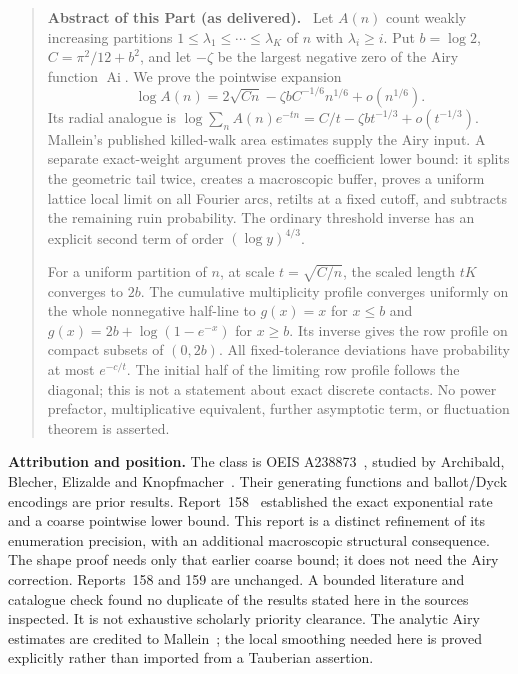 \documentclass[11pt,letterpaper]{article}
\numberwithin{equation}{section}
\theoremstyle{remark}\newtheorem{remark}[theorem]{Remark}
\newenvironment{partabstract}{\begin{quote}\small\noindent\textbf{Abstract of this Part (as delivered).}\ }{\end{quote}}
\begin{document}
\begin{partabstract}
Let $A(n)$ count weakly increasing partitions
$1\leq\lambda_1\leq\cdots\leq\lambda_K$ of $n$ with
$\lambda_i\geq i$. Put $b=\log2$, $C=\pi^2/12+b^2$, and let
$-\zeta$ be the largest negative zero of the Airy function $\operatorname{Ai}$.
We prove the pointwise expansion
\[
 \log A(n)=2\sqrt{Cn}-\zeta b C^{-1/6}n^{1/6}+o(n^{1/6}).
\]
Its radial analogue is
$\log\sum_n A(n)e^{-tn}=C/t-\zeta b t^{-1/3}+o(t^{-1/3})$.
Mallein's published killed-walk area estimates supply the Airy input.
A separate exact-weight argument proves the coefficient lower bound:
it splits the geometric tail twice, creates a macroscopic buffer,
proves a uniform lattice local limit on all Fourier arcs, retilts at
a fixed cutoff, and subtracts the remaining ruin probability.
The ordinary threshold inverse has an explicit second term of order
$(\log y)^{4/3}$.

For a uniform partition of $n$, at scale $t=\sqrt{C/n}$, the scaled length $tK$
converges to $2b$. The cumulative multiplicity profile converges
uniformly on the whole nonnegative half-line to
$g(x)=x$ for $x\leq b$ and
$g(x)=2b+\log(1-e^{-x})$ for $x\geq b$.
Its inverse gives the row profile on compact subsets of $(0,2b)$.
All fixed-tolerance deviations have probability at most $e^{-c/t}$.
The initial half of the limiting row profile follows the diagonal;
this is not a statement about exact discrete contacts.
No power prefactor, multiplicative equivalent, further asymptotic
term, or fluctuation theorem is asserted.
\end{partabstract}
\noindent\textbf{Attribution and position.}
The class is OEIS A238873~\cite{oeisA238873}, studied by Archibald, Blecher,
Elizalde and Knopfmacher~\cite{abek}. Their generating functions and
ballot/Dyck encodings are prior results. Report~158~\cite{r158}
established the exact exponential rate and a coarse pointwise lower
bound. This report is a distinct refinement of its enumeration
precision, with an additional macroscopic structural consequence.
The shape proof needs only that earlier coarse bound; it does not
need the Airy correction. Reports~158 and 159 are unchanged.
A bounded literature and catalogue check found no duplicate of the
results stated here in the sources inspected. It is not exhaustive
scholarly priority clearance. The analytic Airy estimates are credited
to Mallein~\cite{mallein}; the local smoothing needed here is proved
explicitly rather than imported from a Tauberian assertion.
\medskip
\end{document}
